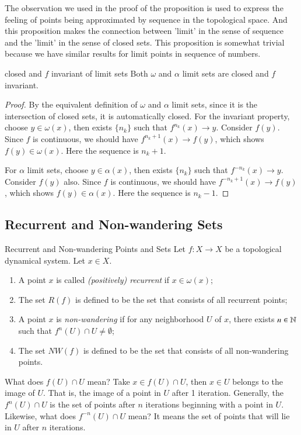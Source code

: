 \documentclass[12pt,a4paper]{article}
\begin{document}
	The observation we used in the proof of the proposition is used to express the feeling of points being approximated by sequence in the topological space. And this proposition makes the connection between 'limit' in the sense of sequence and the 'limit' in the sense of closed sets. This proposition is somewhat trivial because we have similar results for limit points in sequence of numbers.

	
	
	
	\begin{proposition}{closed and $f$ invariant of limit sets}{}
		Both $\omega$ and $\alpha$ limit sets are closed and $f$ invariant.
	\end{proposition}
	\begin{proof}
		By the equivalent definition of $\omega$ and $\alpha$ limit sets, since it is the intersection of closed sets, it is automatically closed. For the invariant property, choose $y\in \omega(x)$, then exists $\{n_k\}$ such that $f^{n_k}(x)\to y$. Consider $f(y)$. Since $f$ is continuous, we should have $f^{n_k+1}(x)\to f(y)$, which shows $f(y)\in \omega(x)$. Here the sequence is $n_k+1$.
		
		For $\alpha$ limit sets, choose $y\in \alpha(x)$, then exists $\{n_k\}$ such that $f^{-n_k}(x)\to y$. Consider $f(y)$ also. Since $f$ is continuous, we should have $f^{-n_k+1}(x)\to f(y)$, which shows $f(y)\in\alpha(x)$. Here the sequence is $n_k-1$. 
	\end{proof}


	\subsection{Recurrent and Non-wandering Sets}
	\begin{definition}{Recurrent and Non-wandering Points and Sets}{}
		Let $f:X\rightarrow X$ be a topological dynamical system. Let $x\in X$. 
		\begin{enumerate}
			\item A point $x$ is called \emph{(positively) recurrent} if $x\in \omega(x)$;
			\item The set $R(f)$ is defined to be the set that consists of all recurrent points;
			\item A point $x$ is \emph{non-wandering} if for any neighborhood $U$ of $x$, there exists $n\in \mathbb{N}$ such that $f^n(U)\cap U\neq \emptyset$;
			\item The set $NW(f)$ is defined to be the set that consists of all non-wandering points.
		\end{enumerate}
	\end{definition}
	What does $f(U)\cap U$ mean? Take $x\in f(U)\cap U$, then $x\in U$ belongs to the image of $U$. That is, the image of a point in $U$ after 1 iteration. Generally, the $f^n(U)\cap U$ is the set of points after $n$ iterations beginning with a point in $U$. Likewise, what does $f^{-n}(U)\cap U$ mean? It means the set of points that will lie in $U$ after $n$ iterations. 
\end{document}
